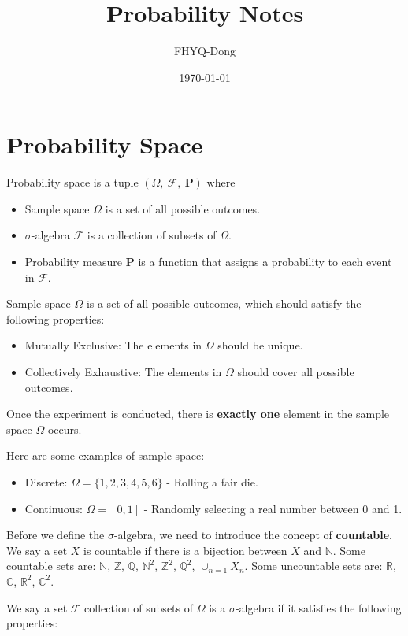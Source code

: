 \documentclass[device=normal, lang=en, fontsize=12pt]{elegantnote}
\title{Probability Notes}
\author{FHYQ-Dong}
\date{\today}
\begin{document}
\maketitle

\section{Probability Space}
\begin{definition}
    Probability space is a tuple $\left(\varOmega,~\mathcal{F},~\mathbf{P}\right)$ where
    \begin{itemize}
        \item Sample space $\varOmega$ is a set of all possible outcomes.
        \item $ \sigma $-algebra $\mathcal{F}$ is a collection of subsets of $\varOmega$.
        \item Probability measure $\mathbf{P}$ is a function that assigns a probability to each event in $\mathcal{F}$.
    \end{itemize}
\end{definition}

\begin{definition}
    Sample space $\varOmega$ is a set of all possible outcomes, which should satisfy the following properties:
    \begin{itemize}
        \item Mutually Exclusive: The elements in $\varOmega$ should be unique.
        \item Collectively Exhaustive: The elements in $\varOmega$ should cover all possible outcomes.
    \end{itemize}
\end{definition}

Once the experiment is conducted, there is \textbf{exactly one} element in the sample space $\varOmega$ occurs.

\begin{example}
    Here are some examples of sample space:
    \begin{itemize}
        \item Discrete: $\varOmega = \{1, 2, 3, 4, 5, 6\}$ - Rolling a fair die.
        \item Continuous: $\varOmega = [0, 1]$ - Randomly selecting a real number between 0 and 1.
    \end{itemize}
\end{example}

Before we define the $\sigma$-algebra, we need to introduce the concept of \textbf{countable}. We say a set $X$ is countable if there is a bijection between $X$ and $\mathbb{N}$. Some countable sets are: $\mathbb{N}$, $\mathbb{Z}$, $\mathbb{Q}$, $\mathbb{N}^2$, $\mathbb{Z}^2$, $\mathbb{Q}^2$, $\cup_{n=1}X_{n}$. Some uncountable sets are: $\mathbb{R}$, $\mathbb{C}$, $\mathbb{R}^2$, $\mathbb{C}^2$.

\begin{definition}
    We say a set $\mathcal{F}$  collection of subsets of $\varOmega$ is a $\sigma$-algebra if it satisfies the following properties:
\end{definition}
\end{document}
